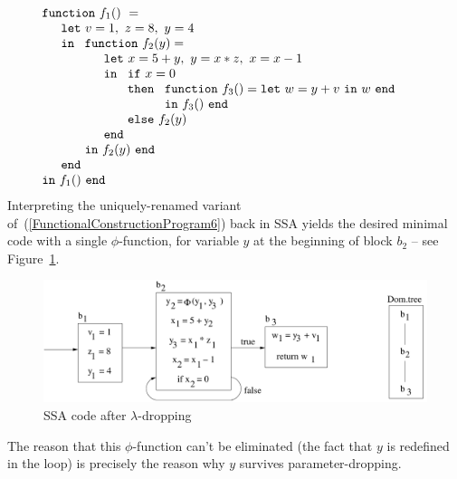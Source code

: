 \begin{equation}
\label{FunctionalConstructionProgram6}
\begin{array}{l}
\mathtt{function}\ f_1()\ = \\
  \quad
  \begin{array}{l}
     \mathtt{let}\ v = 1, \ 
                   z = 8, \ 
                   y = 4\\
     \mathtt{in}\ 
     \begin{array}[t]{l}
       \mathtt{function}\ f_2(y) =\\
         \quad
         \begin{array}{l}
           \mathtt{let}\ x = 5+y,\
                         y = x*z,\
                         x = x-1\\
           \mathtt{in}\
           \begin{array}[t]{l}
             \mathtt{if}\ x=0\\ 
             \mathtt{then}\ 
               \begin{array}[t]{l}
                 \mathtt{function}\ f_3() = 
                 \mathtt{let}\ w = y+v\ \mathtt{in}\ w\ \mathtt{end}\\
                 \mathtt{in}\ f_3()\ \mathtt{end}
               \end{array}\\
             \mathtt{else}\ f_2(y)
           \end{array}\\
           \mathtt{end}
         \end{array}\\
     \mathtt{in}\ f_2(y)\ \mathtt{end}
     \end{array}\\
     \mathtt{end}\\
   \end{array}\\
\mathtt{in}\ f_1()\  \mathtt{end}
\end{array}
\end{equation}
Interpreting the uniquely-renamed variant
of~(\ref{FunctionalConstructionProgram6}) back in SSA yields the
desired minimal code with a single $\phi$-function, for variable $y$
at the beginning of block $b_2$ -- see
Figure~\ref{fig:FunctionalCorrespondenceSSAofLambdaDroppedCode}.
\begin{figure}
\begin{center}
\includegraphics[scale=0.4]{SSAConstructionExample3}
\end{center}
\caption{\label{fig:FunctionalCorrespondenceSSAofLambdaDroppedCode} SSA code after $\lambda$-dropping}
\end{figure}
The reason that this $\phi$-function can't be eliminated (the fact
that $y$ is redefined in the loop) is precisely the reason why $y$
survives parameter-dropping.

